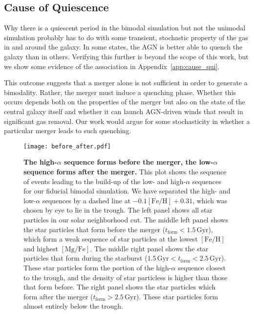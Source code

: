 \documentclass[twocolumn,linenumbers,trackchanges]{aastex631}
\newcommand{\Gyr}{\ensuremath{\textrm{Gyr}}}
\newcommand{\FeH}{\ensuremath{[\textrm{Fe}/\textrm{H}]}}
\newcommand{\MgFe}{\ensuremath{[\textrm{Mg}/\textrm{Fe}]}}
\newcommand{\tform}{\ensuremath{t_{\textrm{form}}}}
\begin{document}
\subsection{Cause of Quiescence}\label{ssec:cause_qui}
Why there is a quiescent period in the bimodal simulation but not the unimodal simulation probably has to do with some transient, stochastic property of the gas in and around the galaxy. In some states, the AGN is better able to quench the galaxy than in others. Verifying this further is beyond the scope of this work, but we show some evidence of the association in Appendix~\ref{app:cause_qui}.

This outcome suggests that a merger alone is not sufficient in order to generate a bimodality. Rather, the merger must induce a quenching phase. Whether this occurs depends both on the properties of the merger but also on the state of the central galaxy itself and whether it can launch AGN-driven winds that result in significant gas removal. Our work would argue for some stochasticity in whether a particular merger leads to such quenching.

\begin{figure*}
  \centering
  \texttt{[image: before\_after.pdf]}
  \caption{\textbf{The high-$\alpha$ sequence forms before the merger, the low-$\alpha$ sequence forms after the merger.} This plot shows the sequence of events leading to the build-up of the low- and high-$\alpha$ sequences for our fiducial bimodal simulation. We have separated the high- and low-$\alpha$ sequences by a dashed line at $-0.1\FeH + 0.31$, which was chosen by eye to lie in the trough. The left panel shows all star particles in our solar neighborhood cut. The middle left panel shows the star particles that form before the merger ($\tform < 1.5\,\Gyr$), which form a weak sequence of star particles at the lowest \FeH and highest \MgFe. The middle right panel shows the star particles that form during the starburst ($1.5\,\Gyr < \tform < 2.5\,\Gyr$). These star particles form the portion of the high-$\alpha$ sequence closest to the trough, and the density of star particless is higher than those that form before. The right panel shows the star particles which form after the merger ($\tform > 2.5\,\Gyr$). These star particles form almost entirely below the trough.}
  \label{fig:before_after}
\end{figure*}
\end{document}
